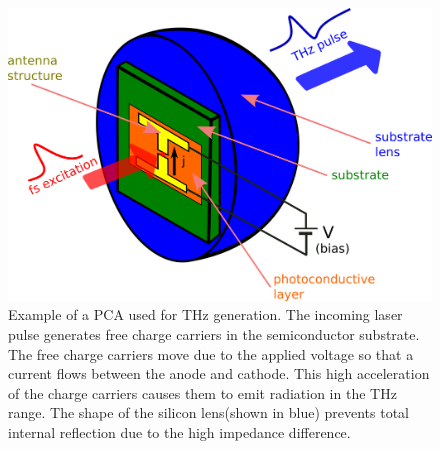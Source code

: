 \begin{figure}[H]
    \centering
    \includegraphics[scale=0.5]{images/TDS/PCA.png}
    \caption{Example of a PCA used for THz generation. The incoming laser pulse generates free charge carriers in the semiconductor substrate. The free charge carriers move due to the applied voltage so that a current flows between the anode and cathode. This high acceleration of the charge carriers causes them to emit radiation in the THz range. The shape of the silicon lens(shown in blue) prevents total internal reflection due to the high impedance difference.}
    \label{fig:PCA}
\end{figure}

